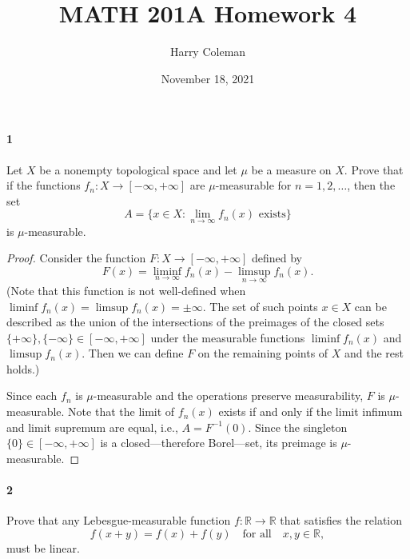 \documentclass[12pt]{article}
\renewcommand{\maketitle}{\thispagestyle{title}}
\newlength{\myparskip}
\newenvironment{fullbox}{\begin{lrbox}{\savefullbox}\begin{minipage}{\dimexpr\textwidth-2\fboxsep\relax}\setlength{\parskip}{\myparskip}}{\end{minipage}\end{lrbox}\framebox[\textwidth]{\usebox{\savefullbox}}}
\newenvironment{pbox}[1][]{\begin{fullbox}\ifx#1\empty\else\paragraph{#1}\fi}{\end{fullbox}}
\theoremstyle{definition}
\newcommand{\isp}[1]{\quad\text{#1}\quad}
\newcommand{\R}{\mathbb{R}}
\newcommand{\<}{\langle}
\renewcommand{\>}{\rangle}
\begin{document}
\title{MATH 201A Homework 4}
\author{Harry Coleman}
\date{November 18, 2021}
\maketitle

\begin{pbox}[1]
    Let $X$ be a nonempty topological space and let $\mu$ be a measure on $X$.
    Prove that if the functions $f_n : X \to [-\infty, +\infty]$ are $\mu$-measurable for $n = 1, 2, \dots$, then the set
    \[
        A = \{x \in X : \lim_{n \to \infty} f_n(x) \text{ exists}\}
    \]
    is $\mu$-measurable.
\end{pbox}


\begin{proof}
    Consider the function $F: X \to [-\infty, +\infty]$ defined by
    \[
        F(x) = \liminf_{n \to \infty} f_n(x) - \limsup_{n \to \infty} f_n(x).
    \]
    (Note that this function is not well-defined when $\liminf f_n(x) = \limsup f_n(x) = \pm\infty$. The set of such points $x \in X$ can be described as the union of the intersections of the preimages of the closed sets  $\{+\infty\}, \{-\infty\} \in [-\infty, +\infty]$ under the measurable functions $\liminf f_n(x)$ and $\limsup f_n(x)$. Then we can define $F$ on the remaining points of $X$ and the rest holds.)

    Since each $f_n$ is $\mu$-measurable and the operations preserve measurability, $F$ is $\mu$-measurable.
    Note that the limit of $f_n(x)$ exists if and only if the limit infimum and limit supremum are equal, i.e., $A = F^{-1}(0)$.
    Since the singleton $\{0\} \in [-\infty, +\infty]$ is a closed---therefore Borel---set, its preimage is $\mu$-measurable. 
\end{proof}


\begin{pbox}[2]
    Prove that any Lebesgue-measurable function $f : \R \to \R$ that satisfies the relation
    \[
        f(x + y) = f(x) + f(y) \isp{for all} x, y \in \R,
    \]
    must be linear.
\end{pbox}
\end{document}
